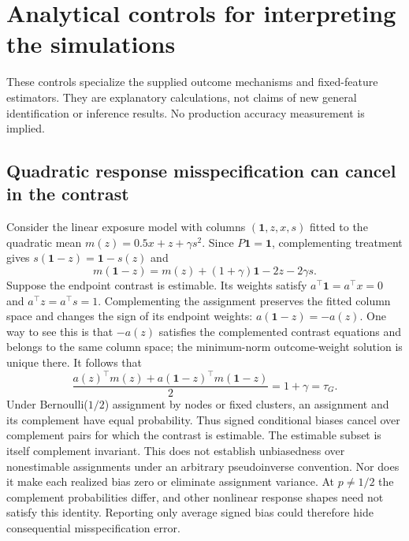 \section{Analytical controls for interpreting the simulations}
\label{app:checks}
These controls specialize the supplied outcome mechanisms and fixed-feature estimators. They are explanatory calculations, not claims of new general identification or inference results. No production accuracy measurement is implied.

\subsection{Quadratic response misspecification can cancel in the contrast}
\label{app:complement}
Consider the linear exposure model with columns $(\mathbf 1,z,x,s)$ fitted to the quadratic mean
$m(z)=0.5x+z+\gamma s^2$. Since $P\mathbf 1=\mathbf 1$, complementing treatment gives $s(\mathbf 1-z)=\mathbf 1-s(z)$ and
\begin{equation}
 m(\mathbf 1-z)=m(z)+(1+\gamma)\mathbf 1-2z-2\gamma s.
\end{equation}
Suppose the endpoint contrast is estimable. Its weights satisfy
$a^\top\mathbf 1=a^\top x=0$ and $a^\top z=a^\top s=1$.
Complementing the assignment preserves the fitted column space and changes the sign of its endpoint weights: $a(\mathbf 1-z)=-a(z)$. One way to see this is that $-a(z)$ satisfies the complemented contrast equations and belongs to the same column space; the minimum-norm outcome-weight solution is unique there. It follows that
\begin{equation}
 \frac{a(z)^\top m(z)+a(\mathbf 1-z)^\top m(\mathbf 1-z)}{2}
 =1+\gamma=\tau_G.
 \label{eq:complement}
\end{equation}
Under Bernoulli($1/2$) assignment by nodes or fixed clusters, an assignment and its complement have equal probability. Thus signed conditional biases cancel over complement pairs for which the contrast is estimable. The estimable subset is itself complement invariant. This does not establish unbiasedness over nonestimable assignments under an arbitrary pseudoinverse convention. Nor does it make each realized bias zero or eliminate assignment variance. At $p\ne1/2$ the complement probabilities differ, and other nonlinear response shapes need not satisfy this identity. Reporting only average signed bias could therefore hide consequential misspecification error.

